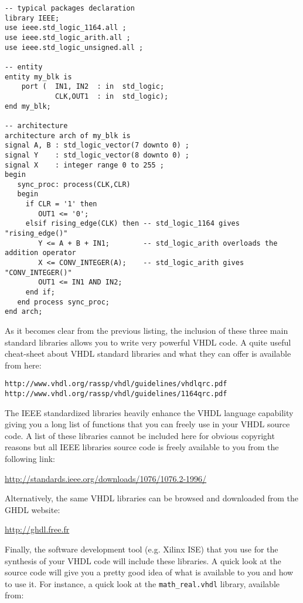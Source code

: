 \begin{lstlisting}[caption=Example of operators and types available with some IEEE packages.]
-- typical packages declaration
library IEEE;
use ieee.std_logic_1164.all ;
use ieee.std_logic_arith.all ;
use ieee.std_logic_unsigned.all ;

-- entity
entity my_blk is 
    port (  IN1, IN2  : in  std_logic; 
            CLK,OUT1  : in  std_logic); 
end my_blk;

-- architecture
architecture arch of my_blk is
signal A, B : std_logic_vector(7 downto 0) ;
signal Y    : std_logic_vector(8 downto 0) ;
signal X    : integer range 0 to 255 ;
begin
   sync_proc: process(CLK,CLR)
   begin
     if CLR = '1' then 
        OUT1 <= '0';  
     elsif rising_edge(CLK) then -- std_logic_1164 gives "rising_edge()"
        Y <= A + B + IN1;        -- std_logic_arith overloads the addition operator
        X <= CONV_INTEGER(A);    -- std_logic_arith gives "CONV_INTEGER()"
        OUT1 <= IN1 AND IN2; 
     end if; 
   end process sync_proc; 
end arch;
\end{lstlisting}
As it becomes clear from the previous listing, the inclusion of these three main standard libraries allows you to write very powerful VHDL code. A quite useful cheat-sheet about VHDL standard libraries and what they can offer is available from here:
\begin{verbatim}
http://www.vhdl.org/rassp/vhdl/guidelines/vhdlqrc.pdf
http://www.vhdl.org/rassp/vhdl/guidelines/1164qrc.pdf
\end{verbatim}

The IEEE standardized libraries heavily enhance the VHDL language capability giving you a long list of functions that you can freely use in your VHDL source code. A list of these libraries cannot be included here for obvious copyright reasons but all IEEE libraries source code is freely available to you from the following link:

\url{http://standards.ieee.org/downloads/1076/1076.2-1996/}

Alternatively, the same VHDL libraries can be browsed and downloaded from the GHDL website:

\url{http://ghdl.free.fr}

Finally, the software development tool (e.g. Xilinx ISE) that you use for the synthesis of your VHDL code will include these libraries. A quick look at the source code will give you a pretty good idea of what is available to you and how to use it. For instance, a quick look at the \texttt{math\_real.vhdl} library, available from: 

